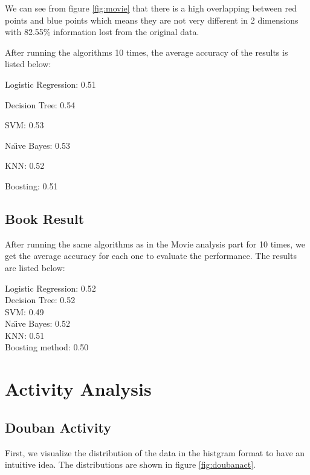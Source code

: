 \documentclass[12pt]{article}
\begin{document}
We can see from figure \ref{fig:movie} that there is a high overlapping between red points and blue points which means they are not very different in 2 dimensions with 82.55\% information lost from the original data.

After running the algorithms 10 times, the average accuracy of the results is listed below:

Logistic Regression: 0.51

Decision Tree: 0.54

SVM: 0.53

Na\"{\i}ve Bayes: 0.53

KNN: 0.52

Boosting: 0.51

\subsection{Book Result}

After running the same algorithms as in the Movie analysis part for 10 times, we get the average accuracy for each one to evaluate the performance. The results are listed below:

Logistic Regression: 0.52 \\
Decision Tree: 0.52 \\
SVM: 0.49 \\
Na\"{\i}ve Bayes: 0.52 \\
KNN: 0.51 \\
Boosting method: 0.50

\section{Activity Analysis}

\subsection{Douban Activity}
First, we visualize the distribution of the data in the histgram format to have an intuitive idea. The distributions are shown in figure \ref{fig:doubanact}.
\end{document}
